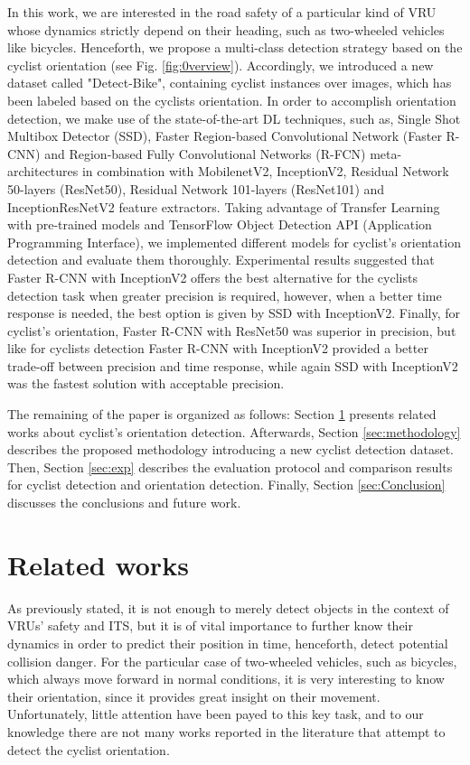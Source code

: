\documentclass[journal]{IEEEtran}
\begin{document}
In this work, we are interested in the road safety of a particular kind of VRU whose dynamics strictly depend on their heading, such as two-wheeled vehicles like bicycles. Henceforth, we propose a multi-class detection strategy based on the cyclist orientation (see Fig. \ref{fig:0verview}). Accordingly, we introduced a new dataset called "Detect-Bike", containing  cyclist instances over  images, which has been labeled based on the cyclists orientation. In order to accomplish orientation detection, we make use of the state-of-the-art DL techniques, such as, Single Shot Multibox Detector (SSD), Faster Region-based Convolutional Network (Faster R-CNN) and Region-based Fully Convolutional Networks (R-FCN) meta-architectures in combination with MobilenetV2, InceptionV2, Residual Network 50-layers (ResNet50), Residual Network 101-layers (ResNet101) and InceptionResNetV2 feature extractors. Taking advantage of Transfer Learning with pre-trained models and TensorFlow Object Detection API (Application Programming Interface), we implemented different models for cyclist's orientation detection and evaluate them thoroughly. Experimental results suggested that Faster R-CNN with InceptionV2 offers the best alternative for the cyclists detection task when greater precision is required, however, when a better time response is needed, the best option is given by SSD with InceptionV2. Finally, for cyclist's orientation, Faster R-CNN with ResNet50 was superior in precision, but like for cyclists detection Faster R-CNN with InceptionV2 provided a better trade-off between precision and time response, while again SSD with InceptionV2 was the fastest solution with acceptable precision.

The remaining of the paper is organized as follows: Section \ref{sec:relatedWorks} presents related works about cyclist's orientation detection. Afterwards, Section \ref{sec:methodology} describes the proposed methodology introducing a new cyclist detection dataset. Then, Section \ref{sec:exp} describes the evaluation protocol and comparison results for cyclist detection and orientation detection. Finally, Section \ref{sec:Conclusion} discusses the conclusions and future work.

\section{Related works}
\label{sec:relatedWorks}

As previously stated, it is not enough to merely detect objects in the context of VRUs' safety and ITS, but it is of vital importance to further know their dynamics in order to predict their position in time, henceforth, detect potential collision danger. For the particular case of two-wheeled vehicles, such as bicycles, which always move forward in normal conditions, it is very interesting to know their orientation, since it provides great insight on their movement. Unfortunately, little attention have been payed to this key task, and to our knowledge there are not many works reported in the literature that attempt to detect the cyclist orientation. 
\end{document}
